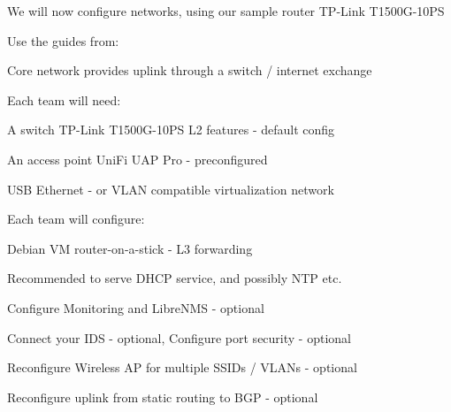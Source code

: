 \documentclass[Screen16to9,17pt]{foils}
\begin{document}

We will now configure networks, using our sample router TP-Link T1500G-10PS

Use the guides from:\\
{\small {}}



\begin{list1}
\item Core network provides uplink through a switch / internet exchange
\item Each team will need:
\begin{list2}
\item A switch TP-Link T1500G-10PS L2 features - default config
\item An access point UniFi UAP Pro - preconfigured
\item USB Ethernet - or VLAN compatible virtualization network
\end{list2}
\item Each team will configure:
\begin{list2}
\item Debian VM router-on-a-stick - L3 forwarding
{\small{}}
\item Recommended to serve DHCP service, and possibly NTP etc.
\item Configure Monitoring and LibreNMS - optional
\item Connect your IDS - optional, Configure port security - optional
\item Reconfigure Wireless AP for multiple SSIDs / VLANs - optional
\item Reconfigure uplink from static routing to BGP - optional
\end{list2}
\end{list1}







\slidenext
\end{document}
